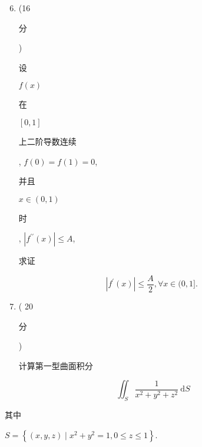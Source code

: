 \documentclass[10pt]{article}
\begin{document}
\begin{enumerate}
  \setcounter{enumi}{5}
  \item (16 \begin{CJK}{UTF8}{mj}分\end{CJK}) \begin{CJK}{UTF8}{mj}设\end{CJK} $f(x)$ \begin{CJK}{UTF8}{mj}在\end{CJK} $[0,1]$ \begin{CJK}{UTF8}{mj}上二阶导数连续\end{CJK}, $f(0)=f(1)=0$, \begin{CJK}{UTF8}{mj}并且\end{CJK} $x \in(0,1)$ \begin{CJK}{UTF8}{mj}时\end{CJK}, $\left|f^{\prime \prime}(x)\right| \leqslant A$, \begin{CJK}{UTF8}{mj}求证\end{CJK}
\end{enumerate}
$$
\left|f^{\prime}(x)\right| \leqslant \frac{A}{2}, \forall x \in(0,1] \text {. }
$$

\begin{enumerate}
  \setcounter{enumi}{6}
  \item ( 20 \begin{CJK}{UTF8}{mj}分\end{CJK}) \begin{CJK}{UTF8}{mj}计算第一型曲面积分\end{CJK}
\end{enumerate}
$$
\iint_{S} \frac{1}{x^{2}+y^{2}+z^{2}} \mathrm{~d} S
$$
\begin{CJK}{UTF8}{mj}其中\end{CJK} $S=\left\{(x, y, z) \mid x^{2}+y^{2}=1,0 \leqslant z \leqslant 1\right\}$.
\end{document}
